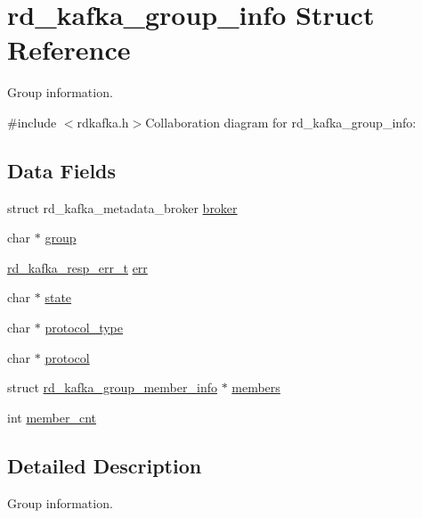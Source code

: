 \hypertarget{structrd__kafka__group__info}{
\section{rd\_\-kafka\_\-group\_\-info Struct Reference}
\label{structrd__kafka__group__info}
}


Group information.  


{\ttfamily \#include $<$rdkafka.h$>$}Collaboration diagram for rd\_\-kafka\_\-group\_\-info:\subsection*{Data Fields}
\begin{DoxyCompactItemize}
\item 
struct rd\_\-kafka\_\-metadata\_\-broker \hyperlink{structrd__kafka__group__info_a379c4e9a10ec2ae18dd7dabe660b29b0}{broker}
\item 
char $\ast$ \hyperlink{structrd__kafka__group__info_a7f8c8687af579ca25e1fb088b3eae4a3}{group}
\item 
\hyperlink{rdkafka_8h_a03509bab51072c72a8dcf52337e6d5cb}{rd\_\-kafka\_\-resp\_\-err\_\-t} \hyperlink{structrd__kafka__group__info_ad8ad977cc6c3d8bd053afdc88876fd31}{err}
\item 
char $\ast$ \hyperlink{structrd__kafka__group__info_a5160a6f8963024c42164aa828eead885}{state}
\item 
char $\ast$ \hyperlink{structrd__kafka__group__info_ab0f0461bf50a6a25ccab90e93d47d31f}{protocol\_\-type}
\item 
char $\ast$ \hyperlink{structrd__kafka__group__info_aab4f80bfc4e0ce38774884e599690a68}{protocol}
\item 
struct \hyperlink{structrd__kafka__group__member__info}{rd\_\-kafka\_\-group\_\-member\_\-info} $\ast$ \hyperlink{structrd__kafka__group__info_a98032bb5d44fcd6fda60e0374ad8a2d4}{members}
\item 
int \hyperlink{structrd__kafka__group__info_a4b0bd08097252d3d086610e63f58bf49}{member\_\-cnt}
\end{DoxyCompactItemize}


\subsection{Detailed Description}
Group information. 

